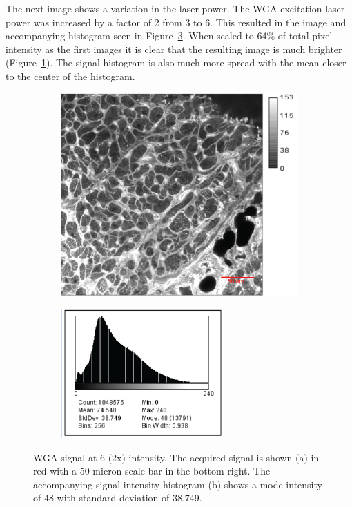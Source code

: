\documentclass[12pt]{article}
\begin{document}
The next image shows a variation in the laser power. The WGA excitation laser power was increased by a factor of 2 from 3 to 6. This resulted in the image and accompanying histogram seen in Figure~\ref{fig:wga_laser}. When scaled to 64\% of total pixel intensity as the first images it is clear that the resulting image is much brighter (Figure~\ref{fig:wga_l}). The signal histogram is also much more spread with the mean closer to the center of the histogram.


\begin{figure}[H]
	\begin{subfigure}{.5\textwidth}
		\centering
		\includegraphics[width=.95\linewidth]{FinalFigures/WGA_2xlaser.png}
		\caption{}
		\label{fig:wga_l}
	\end{subfigure}%
	\begin{subfigure}{.5\textwidth}
		\centering
		\includegraphics[width=.95\linewidth]{FinalFigures/WGA_IncreasedLaser_Hist.png}
		\caption{}
		\label{fig:wga_l_hist}
	\end{subfigure}
	\caption{WGA signal at 6 (2x) intensity. The acquired signal is shown (a) in red with a 50 micron scale bar in the bottom right. The accompanying signal intensity histogram (b) shows a mode intensity of 48 with standard deviation of 38.749.}
	\label{fig:wga_laser}
\end{figure}
\end{document}
